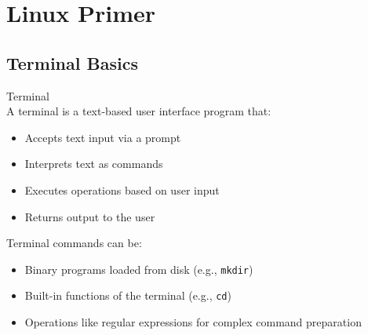 \section{Linux Primer}

\subsection{Terminal Basics}

\begin{definition}{Terminal}\\
    A terminal is a text-based user interface program that:
    \begin{itemize}
        \item Accepts text input via a prompt
        \item Interprets text as commands
        \item Executes operations based on user input
        \item Returns output to the user
    \end{itemize}
    
    Terminal commands can be:
    \begin{itemize}
        \item Binary programs loaded from disk (e.g., \texttt{mkdir})
        \item Built-in functions of the terminal (e.g., \texttt{cd})
        \item Operations like regular expressions for complex command preparation
    \end{itemize}
\end{definition}

